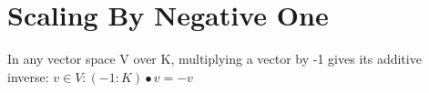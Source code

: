 \section{Scaling By Negative One}

\begin{theorem}
  \label{theorem : neg_one_smul}
  \leanok
  In any vector space V over K, multiplying a vector by -1 gives its additive inverse: $v \in V: (-1 : K) \bullet v = -v$
\end{theorem}
